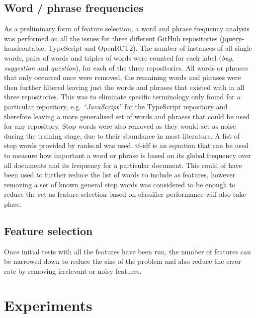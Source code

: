 \subsection{Word / phrase frequencies}
As a preliminary form of feature selection, a word and phrase frequency analysis was performed on all the issues for three
different GitHub repositories (jquery-handsontable, TypeScript and OpenRCT2). The number of instances of all single words, pairs
of words and triples of words were counted for each label (\textit{bug}, \textit{suggestion} and \textit{question}), for each of
the three repositories. All words or phrases that only occurred once were removed, the remaining words and phrases were then
further filtered leaving just the words and phrases that existed with in all three repositories. This was to eliminate specific
terminology only found for a particular repository, e.g. \textit{``JavaScript''} for the TypeScript repository and therefore
leaving a more generalised set of words and phrases that could be used for any repository. Stop words were also removed as they
would act as noise during the training stage, due to their abundance in most literature. A list of stop words provided by
ranks.nl \cite{ranks.nl} was used. tf-idf is an equation that can be used to measure how important a word or phrase is based on
its global frequency over all documents and its frequency for a particular document. This could of have been used to further
reduce the list of words to include as features, however removing a set of known general stop words was considered to be enough
to reduce the set as feature selection based on classifier performance will also take place.

\subsection{Feature selection}
Once initial tests with all the features have been run, the number of features can be narrowed down to reduce the size of the
problem and also reduce the error rate by removing irrelevant or noisy features.

\section{Experiments}

